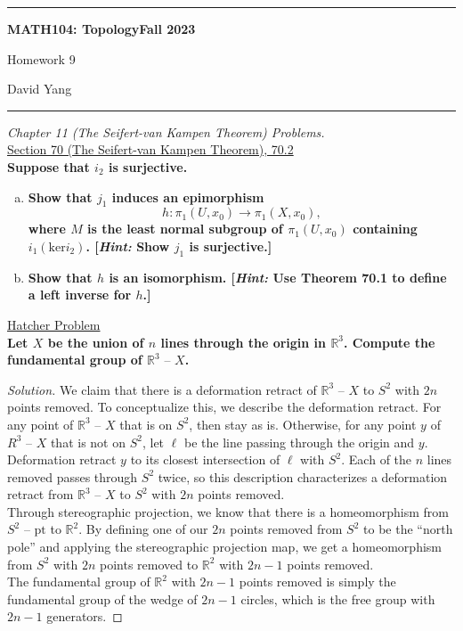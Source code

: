 \documentclass[11pt]{article}
\newcommand{\R}{\mathbb{R}}
\newenvironment{solution}
  {\renewcommand\qedsymbol{$\blacksquare$}\begin{proof}[Solution]}
  {\end{proof}}
\begin{document}
	\hrule
	\begin{center}
        \textbf{MATH104: Topology}\hfill \textbf{Fall 2023}\newline

		{\Large Homework 9}

		David Yang
	\end{center}

\hrule

\vspace{1em}

\textit{Chapter 11 (The Seifert-van Kampen Theorem) Problems.} \\

\underline{Section 70 (The Seifert-van Kampen Theorem), 70.2} \\

\textbf{Suppose that $i_2$ is surjective.}
\begin{enumerate}[a)]
    \item \textbf{Show that $j_1$ induces an epimorphism}
    \[
        h\colon \pi_1(U, x_0) \rightarrow \pi_1(X, x_0),
    \]
    \textbf{where $M$ is the least normal subgroup of $\pi_1(U, x_0)$ containing $i_1(\mathrm{ker} i_2)$. [\textit{Hint:} Show $j_1$ is surjective.]}

    \item \textbf{Show that $h$ is an isomorphism. [\textit{Hint:} Use Theorem 70.1 to define a left inverse for $h$.]}
\end{enumerate}

\newpage

\underline{Hatcher Problem} \\

\textbf{Let $X$ be the union of $n$ lines through the origin in $\R^3$. Compute the fundamental group of $\R^3 \text{ -- } X$.}

\begin{solution}
We claim that there is a deformation retract of $\R^3 \text{ -- } X$ to $S^2$ with $2n$ points removed. To conceptualize this,
we describe the deformation retract. For any point of $\R^3 \text{ -- } X$ that is on $S^2$, then stay as is. 
Otherwise, for any point $y$ of $R^3 \text{ -- } X$ that is not on $S^2$, let $\ell$ be the line passing through the origin and $y$.
Deformation retract $y$ to its closest intersection of $\ell$ with $S^2$. Each of the $n$ lines removed passes through $S^2$ twice,
so this description characterizes a deformation retract from $\R^3 \text{ -- } X$ to $S^2$ with $2n$ points removed. \\

Through stereographic projection, we know that there is a homeomorphism from $S^2 \text{ -- pt}$ to $\R^2$. 
By defining one of our $2n$ points removed from $S^2$ to be the ``north pole'' and applying the stereographic projection map,
we get a homeomorphism from $S^2$ with $2n$ points removed to $\R^2$ with $2n-1$ points removed. \\

The fundamental group of $\R^2$ with $2n-1$ points removed is simply the fundamental group of the wedge of $2n-1$ circles, which is the free group with $2n-1$ generators.
\end{solution}
\end{document}
